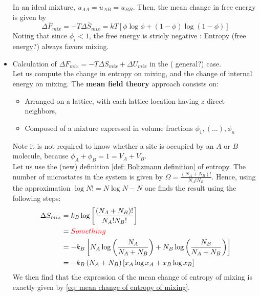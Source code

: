 \documentclass[../phys-f308.tex]{subfiles}
\begin{document}
\begin{example}
\begin{itemize}
        In an ideal mixture, $u_{AA} = u_{AB} = u_{BB}$. Then, the mean change in free energy is given by
        \begin{equation}
            \Delta \overline{F}_{mix} = -T\Delta\overline{S}_{mix} = kT\left[\phi\log\phi+\left(1-\phi\right)\log\left(1-\phi\right)\right]
        \end{equation}
        Noting that since $\phi_i < 1$, the free energy is stricly negative : \color{red} Entropy (free energy?)\color{black} always favors mixing.

        \item Calculation of $\Delta F_{mix} = -T\Delta S_{mix} + \Delta U_{mix}$ in the (\color{red} general\color{black}?) case.\\
        
        Let us compute the change in entropy on mixing, and the change of internal energy on mixing. The \color{purple}\textbf{mean field theory }\color{black} approach consists on:
        \begin{itemize}
            \item Arranged on a lattice, with each lattice location having $z$ direct neighbors,
            \item Composed of a mixture expressed in volume fractions $\phi_1,(...),\phi_n$
        \end{itemize}
        Note it is not required to know whether a site is occupied by an $A$ or $B$ molecule, because $\phi_A+\phi_B = 1 = V_A+V_B$.\\

        Let us use the (new) definition \ref{def: Boltzmann definition} of entropy. The number of microstates in the system is given by $\Omega = \frac{\left(N_A+N_B\right)!}{N_A!N_B}$. Hence, using the approximation $\log N! = N\log N - N$ one finds the result using the following steps:
        \begin{align}
            \Delta S_{mix} &= k_B\log\left[\frac{\left(N_A+N_B\right)!}{N_A!N_B!}\right]\\
            &= \textcolor{red}{Something}\color{black}\\
            &= -k_B\left[N_A\log\left(\frac{N_A}{N_A+N_B}\right)+N_B\log\left(\frac{N_B}{N_A+N_B}\right)\right]\\
            &= -k_B\left(N_A+N_B\right)\left[x_A\log x_A+x_B\log x_B\right]
        \end{align}
        We then find that the expression of the mean change of entropy of mixing is exactly given by \eqref{eq: mean change of entropy of mixing}.\\


\end{itemize}
\end{example}
\end{document}
